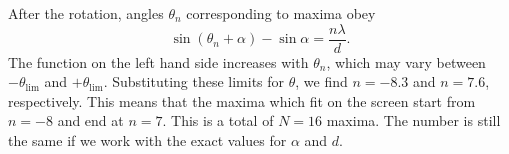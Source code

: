 \documentclass[../TST.tex]{subfiles}
\begin{document}
\begin{solution}
After the rotation, angles $\theta_n$ corresponding to maxima obey
\begin{equation*}
	\sin{(\theta_n+\alpha)-\sin{\alpha}}=\frac{n\lambda}{d}
.
\end{equation*}
The function on the left hand side increases with $\theta_n$, which may vary between $-\theta_\mathrm{lim}$ and $+\theta_\mathrm{lim}$. Substituting these limits for $\theta$, we find $n=-8.3$ and $n=7.6$, respectively. This means that the maxima which fit on the screen start from $n=-8$ and end at $n=7$. This is a total of $\boxed{N=16}$ maxima. The number is still the same if we work with the exact values for $\alpha$ and $d$.

\end{solution}
\fi
\end{document}
